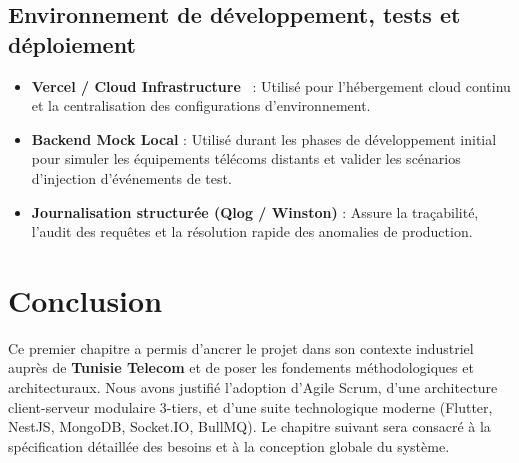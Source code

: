 \subsection{Environnement de d\'eveloppement, tests et d\'eploiement}
\begin{itemize}
    \item \textbf{Vercel / Cloud Infrastructure}~\cite{vercel2025} : Utilis\'e pour l'h\'ebergement cloud continu et la centralisation des configurations d'environnement.
    \item \textbf{Backend Mock Local} : Utilis\'e durant les phases de d\'eveloppement initial pour simuler les \'equipements t\'el\'ecoms distants et valider les sc\'enarios d'injection d'\'ev\'enements de test.
    \item \textbf{Journalisation structur\'ee (Qlog / Winston)} : Assure la tra\c{c}abilit\'e, l'audit des requ\^etes et la r\'esolution rapide des anomalies de production.
\end{itemize}

\section*{Conclusion}
Ce premier chapitre a permis d'ancrer le projet dans son contexte industriel aupr\`es de \textbf{Tunisie Telecom} et de poser les fondements m\'ethodologiques et architecturaux. Nous avons justifi\'e l'adoption d'Agile Scrum, d'une architecture client-serveur modulaire 3-tiers, et d'une suite technologique moderne (Flutter, NestJS, MongoDB, Socket.IO, BullMQ). Le chapitre suivant sera consacr\'e \`a la sp\'ecification d\'etaill\'ee des besoins et \`a la conception globale du syst\`eme.
